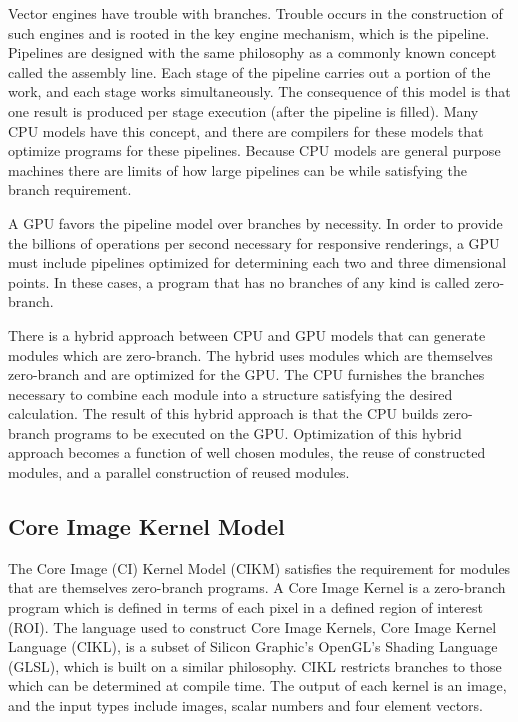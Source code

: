 \documentclass[11pt]{article}
\begin{document}
Vector engines have trouble with branches.  %
Trouble occurs in the construction of such engines and is rooted in the key engine mechanism, which is the pipeline.   Pipelines are designed with the same philosophy as a commonly known concept called the assembly line.  Each stage of the pipeline carries out a portion of the work, and each stage works simultaneously.  The consequence of this model is that one result is produced per stage execution (after the pipeline is filled).   Many CPU models have this concept,  and there are  compilers for these models that optimize programs for these pipelines.  Because CPU models are  general purpose machines there are limits of how large pipelines can be while satisfying the branch requirement.

A GPU favors the pipeline model over branches by necessity.  In order to provide the billions of operations per second necessary for responsive renderings, a GPU must include pipelines optimized for determining each two and three dimensional points.   In these cases, a program that has no branches of any kind is called zero-branch.  

There is a hybrid approach between CPU and GPU models that can generate modules which are zero-branch.  The hybrid uses modules which are themselves zero-branch and are optimized for the GPU.  The CPU furnishes the branches necessary to combine each module into a structure satisfying the desired calculation.  The result of this hybrid approach is that the CPU builds zero-branch programs to be executed on the GPU.   Optimization of this hybrid approach becomes a function of well chosen modules, the reuse of constructed modules, and a parallel construction of reused modules.  


\subsection{Core Image Kernel Model}
The Core Image (CI) Kernel Model (CIKM) satisfies the requirement for modules that are themselves zero-branch programs.  A Core Image Kernel is a zero-branch program which is defined in terms of each pixel in a defined region of interest (ROI).  The language used to construct Core Image Kernels, Core Image Kernel Language (CIKL), is a subset of Silicon Graphic's OpenGL's Shading Language (GLSL), which is built on a similar philosophy.   CIKL restricts branches to those which can be determined at compile time.   The output of each kernel is an image, and the input types include images, scalar numbers and four element vectors.  
\end{document}
